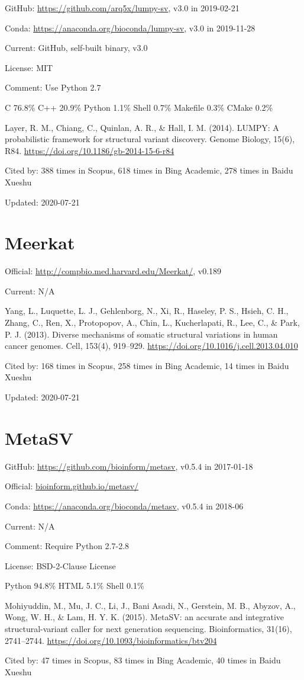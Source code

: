 \documentclass[]{article}
\newcommand{\cb}[3]{\par Cited by: {\color{blue}\Huge #1} times in Scopus, {\color{blue}\Huge #2} times in Bing Academic, {\color{blue}\Huge #3} times in Baidu Xueshu}
\begin{document}
GitHub: \url{https://github.com/arq5x/lumpy-sv}, v3.0 in 2019-02-21

Conda: \url{https://anaconda.org/bioconda/lumpy-sv}, v3.0 in 2019-11-28

Current: GitHub, self-built binary, v3.0

License: MIT

Comment: Use Python 2.7

C 76.8\% C++ 20.9\% Python 1.1\% Shell 0.7\% Makefile 0.3\% CMake 0.2\%

Layer, R. M., Chiang, C., Quinlan, A. R., \& Hall, I. M. (2014). LUMPY: A probabilistic framework for structural variant discovery. Genome Biology, 15(6), R84. \url{https://doi.org/10.1186/gb-2014-15-6-r84} \cb{388}{618}{278}

Updated: 2020-07-21

\section{Meerkat}

Official: \url{http://compbio.med.harvard.edu/Meerkat/}, v0.189

Current: N/A

Yang, L., Luquette, L. J., Gehlenborg, N., Xi, R., Haseley, P. S., Hsieh, C. H., Zhang, C., Ren, X., Protopopov, A., Chin, L., Kucherlapati, R., Lee, C., \& Park, P. J. (2013). Diverse mechanisms of somatic structural variations in human cancer genomes. Cell, 153(4), 919–929. \url{https://doi.org/10.1016/j.cell.2013.04.010}\cb{168}{258}{14}

Updated: 2020-07-21

\section{MetaSV}

GitHub: \url{https://github.com/bioinform/metasv}, v0.5.4 in 2017-01-18

Official: \url{bioinform.github.io/metasv/}

Conda: \url{https://anaconda.org/bioconda/metasv}, v0.5.4 in 2018-06

Current: N/A

Comment: Require Python 2.7-2.8

License: BSD-2-Clause License

Python 94.8\% HTML 5.1\% Shell 0.1\%

Mohiyuddin, M., Mu, J. C., Li, J., Bani Asadi, N., Gerstein, M. B., Abyzov, A., Wong, W. H., \& Lam, H. Y. K. (2015). MetaSV: an accurate and integrative structural-variant caller for next generation sequencing. Bioinformatics, 31(16), 2741–2744. \url{https://doi.org/10.1093/bioinformatics/btv204}\cb{47}{83}{40}
\end{document}
